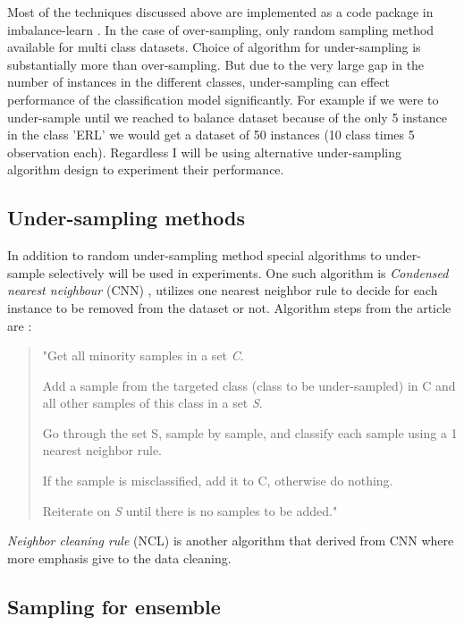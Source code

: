\documentclass[12pt]{article}
\begin{document}
Most of the techniques discussed above are implemented as a code package in imbalance-learn \cite{imbalancelearn}. In the case of over-sampling, only random sampling method available for multi class datasets. Choice of algorithm for under-sampling is substantially more than over-sampling. But due to the very large gap in the number of instances in the different classes, under-sampling can effect performance of the classification model significantly. For example if we were to under-sample until we reached to balance dataset because of the only 5 instance in the class 'ERL' we would get a dataset of 50 instances (10 class times 5 observation each). Regardless I will be using alternative under-sampling algorithm design to experiment their performance. 

\subsection{Under-sampling methods} \label{subsec:undersample}

In addition to random under-sampling method special algorithms to under-sample selectively will be used in experiments. One such algorithm is \textit{Condensed nearest neighbour} (CNN) \cite{condense}, utilizes one nearest neighbor rule to decide for each instance to be removed from the dataset or not. Algorithm steps from the article are \cite{condense}:

\begin{quote}
    "Get all minority samples in a set \textit{C}.

    Add a sample from the targeted class (class to be under-sampled) in C and all other samples of this class in a set \textit{S}.


    Go through the set S, sample by sample, and classify each sample using a 1 nearest neighbor rule.

    If the sample is misclassified, add it to C, otherwise do nothing.

    Reiterate on \textit{S} until there is no samples to be added."
\end{quote}

\textit{Neighbor cleaning rule} (NCL) \cite{neighborcleaning} is another algorithm that derived from CNN where more emphasis give to the data cleaning.

\subsection{Sampling for ensemble} \label{subsec:ensemble}
\end{document}
